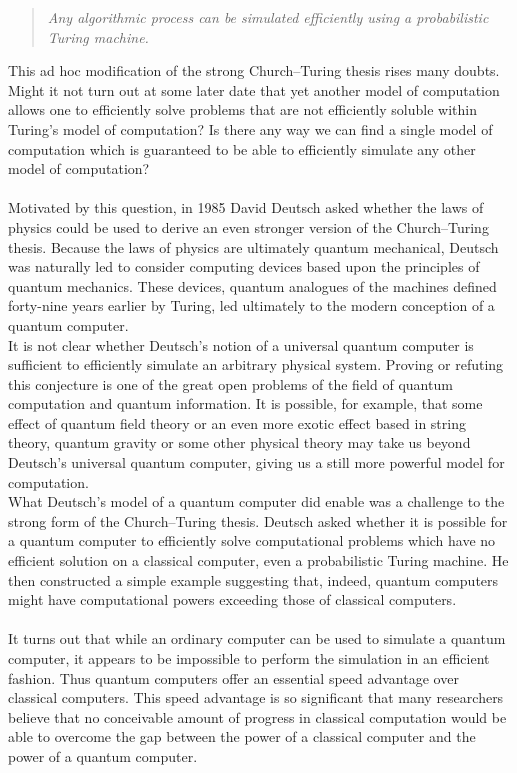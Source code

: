 \begin{quote}
    \textit{Any algorithmic process can be simulated efficiently using a probabilistic Turing machine.}
\end{quote}
This ad hoc modification of the strong Church–Turing thesis rises many doubts. Might it not turn out at some later date that yet another model of computation allows one to efficiently solve problems that are not efficiently soluble within Turing’s model of computation? Is there any way we can find a single model of computation which is guaranteed to be able to efficiently simulate any other model of computation? \\
\\
Motivated by this question, in 1985 David Deutsch asked whether the laws of physics could be used to derive an even stronger version of the Church–Turing thesis. Because the laws of physics are ultimately quantum mechanical, Deutsch was naturally led to consider computing devices based upon the principles of quantum mechanics. These devices, quantum analogues of the machines defined forty-nine years earlier by Turing, led ultimately to the modern conception of a quantum computer. \\
It is not clear whether Deutsch’s notion of a universal quantum computer is sufficient to efficiently simulate an arbitrary physical system. Proving or refuting this conjecture is one of the great open problems of the field of quantum computation and quantum information. It is possible, for example, that some effect of quantum field theory or an even more exotic effect based in string theory, quantum gravity or some other physical theory may take us beyond Deutsch’s universal quantum computer, giving us a still more powerful model for computation. \\
What Deutsch’s model of a quantum computer did enable was a challenge to the strong form of the Church–Turing thesis. Deutsch asked whether it is possible for a quantum computer to efficiently solve computational problems which have no efficient solution on a classical computer, even a probabilistic Turing machine. He then constructed a simple example suggesting that, indeed, quantum computers might have computational powers exceeding those of classical computers. \\
\\
It turns out that while an ordinary computer can be used to simulate a quantum computer, it appears to be impossible to perform the simulation in an efficient fashion. Thus quantum computers offer an essential speed advantage over classical computers. This speed advantage is so significant that many researchers believe that no conceivable amount of progress in classical computation would be able to overcome the gap between the power of a classical computer and the power of a quantum computer. \\
